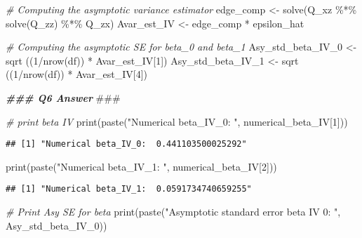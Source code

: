 \documentclass[
]{article}
\newenvironment{Shaded}{\begin{snugshade}}{\end{snugshade}}
\newcommand{\AlertTok}[1]{\textcolor[rgb]{0.94,0.16,0.16}{#1}}
\newcommand{\CommentTok}[1]{\textcolor[rgb]{0.56,0.35,0.01}{\textit{#1}}}
\newcommand{\DecValTok}[1]{\textcolor[rgb]{0.00,0.00,0.81}{#1}}
\newcommand{\DocumentationTok}[1]{\textcolor[rgb]{0.56,0.35,0.01}{\textbf{\textit{#1}}}}
\newcommand{\FunctionTok}[1]{\textcolor[rgb]{0.00,0.00,0.00}{#1}}
\newcommand{\NormalTok}[1]{#1}
\newcommand{\OtherTok}[1]{\textcolor[rgb]{0.56,0.35,0.01}{#1}}
\newcommand{\SpecialCharTok}[1]{\textcolor[rgb]{0.00,0.00,0.00}{#1}}
\newcommand{\StringTok}[1]{\textcolor[rgb]{0.31,0.60,0.02}{#1}}
\begin{document}
\begin{Shaded}
\begin{Highlighting}[]
\CommentTok{\# Computing the asymptotic variance estimator}
\NormalTok{edge\_comp }\OtherTok{\textless{}{-}} \FunctionTok{solve}\NormalTok{(Q\_xz }\SpecialCharTok{\%*\%} \FunctionTok{solve}\NormalTok{(Q\_zz) }\SpecialCharTok{\%*\%}\NormalTok{ Q\_zx)}
\NormalTok{Avar\_est\_IV }\OtherTok{\textless{}{-}}\NormalTok{ edge\_comp }\SpecialCharTok{*}\NormalTok{ epsilon\_hat}

\CommentTok{\# Computing the asymptotic SE for beta\_0 and beta\_1}
\NormalTok{Asy\_std\_beta\_IV\_0 }\OtherTok{\textless{}{-}} \FunctionTok{sqrt}\NormalTok{ ((}\DecValTok{1}\SpecialCharTok{/}\FunctionTok{nrow}\NormalTok{(df)) }\SpecialCharTok{*}\NormalTok{ Avar\_est\_IV[}\DecValTok{1}\NormalTok{])}
\NormalTok{Asy\_std\_beta\_IV\_1 }\OtherTok{\textless{}{-}} \FunctionTok{sqrt}\NormalTok{ ((}\DecValTok{1}\SpecialCharTok{/}\FunctionTok{nrow}\NormalTok{(df)) }\SpecialCharTok{*}\NormalTok{ Avar\_est\_IV[}\DecValTok{4}\NormalTok{])}

\DocumentationTok{\#\#\# Q6 Answer }\AlertTok{\#\#\#}

\CommentTok{\# print beta IV}
\FunctionTok{print}\NormalTok{(}\FunctionTok{paste}\NormalTok{(}\StringTok{"Numerical beta\_IV\_0: "}\NormalTok{, numerical\_beta\_IV[}\DecValTok{1}\NormalTok{]))}
\end{Highlighting}
\end{Shaded}

\begin{verbatim}
## [1] "Numerical beta_IV_0:  0.441103500025292"
\end{verbatim}

\begin{Shaded}
\begin{Highlighting}[]
\FunctionTok{print}\NormalTok{(}\FunctionTok{paste}\NormalTok{(}\StringTok{"Numerical beta\_IV\_1: "}\NormalTok{, numerical\_beta\_IV[}\DecValTok{2}\NormalTok{]))}
\end{Highlighting}
\end{Shaded}

\begin{verbatim}
## [1] "Numerical beta_IV_1:  0.0591734740659255"
\end{verbatim}

\begin{Shaded}
\begin{Highlighting}[]
\CommentTok{\# Print Asy SE for beta}
\FunctionTok{print}\NormalTok{(}\FunctionTok{paste}\NormalTok{(}\StringTok{"Asymptotic standard error beta IV 0: "}\NormalTok{, Asy\_std\_beta\_IV\_0))}
\end{Highlighting}
\end{Shaded}
\end{document}
